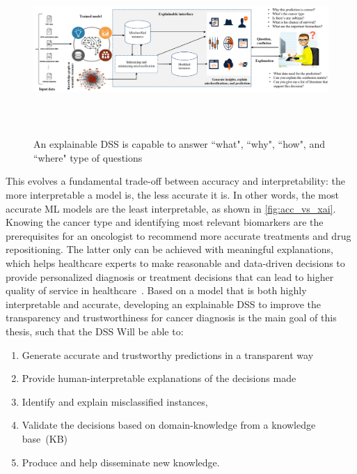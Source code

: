 \begin{figure}
	\centering
	\includegraphics[width=\linewidth,height=65mm]{images/xai_interface.png}
	\caption{An explainable DSS is capable to answer ``what", ``why", ``how", and ``where" type of questions}
    \label{fig:model_bbm}
    \vspace{-2mm}
\end{figure}

\hspace*{3.5mm} This evolves a fundamental trade-off between accuracy and interpretability: the more interpretable a model is, the less accurate it is. In other words, the most accurate ML models are the least interpretable, as shown in \cref{fig:acc_vs_xai}. Knowing the cancer type and identifying most relevant biomarkers are the prerequisites for an oncologist to recommend more accurate treatments and drug repositioning. The latter only can be achieved with meaningful explanations, which helps healthcare experts to make reasonable and data-driven decisions to provide personalized diagnosis or treatment decisions that can lead to higher quality of service in healthcare~\cite{stiglic2020interpretability}. Based on a model that is both highly interpretable and accurate, developing an explainable DSS to improve the transparency and trustworthiness for cancer diagnosis is the main goal of this thesis, such that the DSS Will be able to: 

\vspace{-2mm}
\begin{enumerate}[noitemsep]
    \item Generate accurate and trustworthy predictions in a transparent way
    \item Provide human-interpretable explanations of the decisions made
    \item Identify and explain misclassified instances, 
    \item Validate the decisions based on domain-knowledge from a knowledge base~(KB)
    \item Produce and help disseminate new knowledge. 
\end{enumerate}
\vspace{-2mm}


